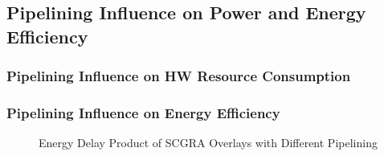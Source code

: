 \documentclass[accentcolor=tud1a,colorbacktitle,inverttitle,landscape,german,presentation,t]{tudbeamer}
\begin{document}
  \subsection{Pipelining Influence on Power and Energy Efficiency}
  \begin{frame}
  \frametitle{Pipelining Influence on HW Resource Consumption}
  \begin{figure}
  \end{figure}

  \begin{figure}
  \end{figure}
  \end{frame}

  \begin{frame}
  \frametitle{Pipelining Influence on Energy Efficiency}
  \vspace{-1em}
  \begin{figure}[htb]
  \centering
  \hfill
  \vspace{-0.6em}
  \caption{Energy Delay Product of SCGRA Overlays with Different Pipelining}
  \label{fig:pipeline-edp}
  \end{figure}
  \end{frame}
\end{document}
